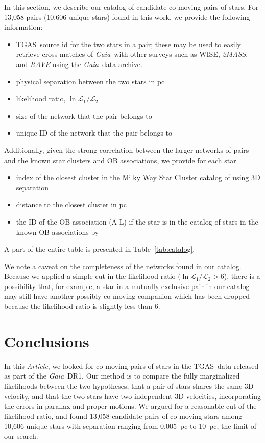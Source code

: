 \documentclass[manuscript, letterpaper]{aastex6}
\newcommand{\project}[1]{\textsl{#1}}
\newcommand{\acronym}[1]{{\small{#1}}}
\newcommand{\gaia}{\project{Gaia}}
\newcommand{\rave}{\project{\acronym{RAVE}}}
\newcommand{\tmass}{\project{\acronym{2MASS}}}
\newcommand{\documentname}{\textsl{Article}}
\newcommand{\tgas}{\acronym{TGAS}}
\begin{document}
In this section, we describe our catalog of candidate co-moving pairs of stars.
For 13,058 pairs (10,606 unique stars) found in this work,
we provide the following information:
%
\begin{itemize}
  \item \tgas\ source id for the two stars in a pair; these may be used to easily
  retrieve cross matches of \gaia\ with other surveys such as WISE, \tmass, and \rave
  using the \gaia\ data archive.
  \item physical separation between the two stars in pc
  \item likelihood ratio, $\ln \mathcal{L}_1 /\mathcal{L}_2$
  \item size of the network that the pair belongs to
  \item unique ID of the network that the pair belongs to
\end{itemize}
%
Additionally, given the strong correlation between the larger networks of pairs
and the known star clusters and OB associations, we provide for each star
%
\begin{itemize}
  \item index of the closest cluster in the Milky Way Star Cluster catalog of
  \citet{Kharchenko:2016aa} using 3D separation
  \item distance to the closest cluster in pc
  \item the ID of the OB association (A-L) if the star is in the catalog of
  stars in the known OB associations by \citet{de-Zeeuw:1999aa}
\end{itemize}
%
A part of the entire table is presented in Table~\ref{tab:catalog}.



We note a caveat on the completeness of the networks found in our catalog.
Because we applied a simple cut in the likelihood ratio ($\ln \mathcal{L}_1 /\mathcal{L}_2>6$),
there is a possibility that, for example, a star in a mutually exclusive pair in our catalog may
still have another possibly co-moving companion which has been dropped because the likelihood ratio
is slightly less than 6.

\section{Conclusions}

In this \documentname, we looked for co-moving pairs of stars in the
\tgas\ data released as part of the \gaia\ DR1.
Our method is to compare
the fully marginalized likelihoods between the two hypotheses, that a pair of
stars shares the same 3D velocity, and that the two stars have two independent
3D velocities, incorporating the errors in parallax and proper motions.
We argued for a reasonable cut of the likelihood ratio, and found
13,058 candidate pairs of co-moving stars among 10,606 unique stars
with separation ranging from 0.005~pc to 10~pc, the limit of our search.
\end{document}
